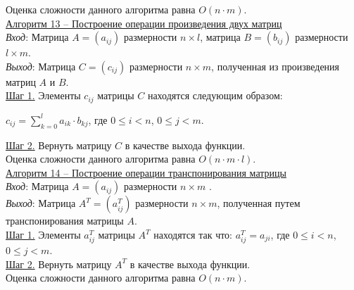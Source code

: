 \documentclass[bachelor, och, labwork]{shiza}
\begin{document}
            Оценка сложности данного алгоритма равна $O(n \cdot m)$.\\


        \underline{Алгоритм 13 -- Построение операции произведения двух матриц}\\
            \textit{Вход}: Матрица $A = (a_{ij})$ размерности $n \times l$, матрица $B = (b_{ij})$ размерности $l \times m$.\\
            \textit{Выход}: Матрица $C = (c_{ij})$ размерности $n \times m$, полученная из произведения матриц $A$ и $B$.\\
            \underline{Шаг 1.} Элементы $c_{ij}$ матрицы $C$ находятся следующим образом:
             
            \begin{center}
                $c_{ij} = \sum_{k = 0}^{l} a_{ik} \cdot b_{kj}$, где $0 \leq i < n$, $0 \leq j < m$. \\
            \end{center}
            \underline{Шаг 2.} Вернуть матрицу $C$ в качестве выхода функции.\\
        
            Оценка сложности данного алгоритма равна $O(n \cdot m \cdot l)$.\\

    
        \underline{Алгоритм 14 -- Построение операции транспонирования матрицы}\\
            \textit{Вход}: Матрица $A = (a_{ij})$ размерности $n \times m$ .\\
            \textit{Выход}: Матрица $A^T = (a^{T}_{ij})$ размерности $n \times m$, полученная путем транспонирования матрицы $A$.\\
            \underline{Шаг 1.} Элементы $a^T_{ij}$ матрицы $A^T$ находятся так что: $a^T_{ij} = a_{ji}$, где $0 \leq i < n$, $0 \leq j < m$. \\
            \underline{Шаг 2.} Вернуть матрицу $A^T$ в качестве выхода функции.\\
        
            Оценка сложности данного алгоритма равна $O(n \cdot m)$.\\
\end{document}

